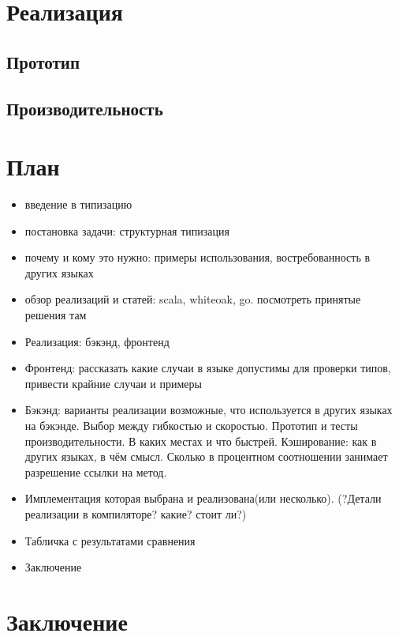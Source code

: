 \documentclass{spbau-diploma}
\begin{document}
\section{Реализация}
\subsection{Прототип}
\subsection{Производительность}

\section{План}

\begin{itemize}
    \item введение в типизацию
    \item постановка задачи: структурная типизация
    \item почему и кому это нужно: примеры использования, востребованность в других языках
    \item обзор реализаций и статей: scala, whiteoak, go. посмотреть принятые решения там
    \item Реализация: бэкэнд, фронтенд
    \item Фронтенд: рассказать какие случаи в языке допустимы для проверки типов, привести крайние случаи и примеры
    \item Бэкэнд: варианты реализации возможные, что используется в других языках на бэкэнде. Выбор между гибкостью и скоростью. Прототип и тесты производительности. В каких местах и что быстрей. Кэширование: как в других языках, в чём смысл. Сколько в процентном соотношении занимает разрешение ссылки на метод.
    \item Имплементация которая выбрана и реализована(или несколько). (?Детали реализации в компиляторе? какие? стоит ли?)
    \item Табличка с результатами сравнения
    \item Заключение
\end{itemize}


\section*{Заключение}



\end{document}
